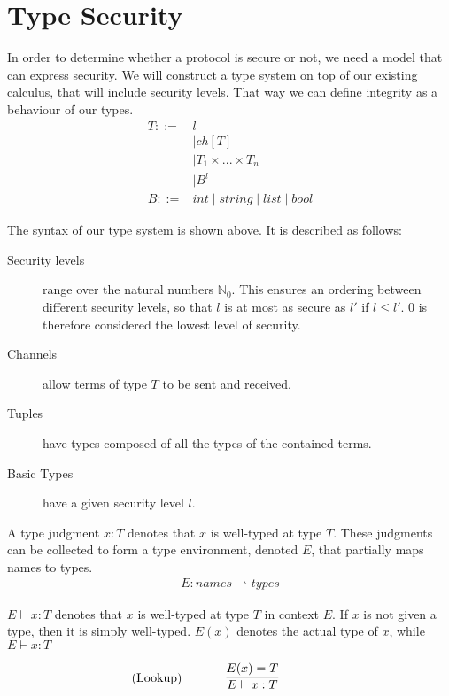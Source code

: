 \section{Type Security}
In order to determine whether a protocol is secure or not, we need a model that can express security.
We will construct a type system on top of our existing calculus, that will include security levels.
That way we can define integrity as a behaviour of our types.
\begin{align*}
	T::=&l \tag{Security Level}\\
	&\mid ch[T] \tag{Channel}\\
	&\mid T_1 \times...\times T_n \tag{Tuple}\\
	&\mid B^l \tag{Basic}\\
	B::=&int 
	\mid string 
	\mid list 
	\mid bool 
\end{align*}

\noindent The syntax of our type system is shown above. It is described as follows:

\begin{description}
\item[Security levels] range over the natural numbers $\mathbb{N}_0$. This ensures an ordering between different security levels, so that $l$ is at most as secure as $l'$ if $l\leq l'$. $0$ is therefore considered the lowest level of security.
\item[Channels] allow terms of type $T$ to be sent and received.
\item[Tuples] have types composed of all the types of the contained terms.
\item[Basic Types] have a given security level $l$.
\end{description}

\noindent A type judgment $x:T$ denotes that $x$ is well-typed at type $T$.
These judgments can be collected to form a type environment, denoted $E$, that partially maps names to types.
\begin{align*}
E: names \rightharpoonup types
\end{align*}

\noindent $E\vdash x:T$ denotes that $x$ is well-typed at type $T$ in context $E$.
If $x$ is not given a type, then it is simply well-typed. $E(x)$ denotes the actual type of $x$, while $E\vdash x:T$ 

\begin{align*}
\tag{Lookup}\label{rule:derive} &\infrule{E(x)=T}{E\vdash x:T}
\end{align*}

